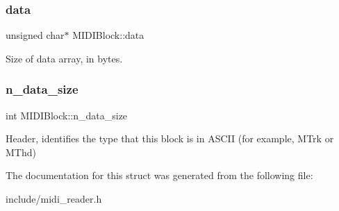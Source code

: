 \subsubsection{\texorpdfstring{data}{data}}
{\footnotesize\ttfamily unsigned char$\ast$ M\+I\+D\+I\+Block\+::data}

Size of data array, in bytes. \mbox{\label{structMIDIBlock_a20638ff9789b0deb8ece121078066931}} 
\subsubsection{\texorpdfstring{n\+\_\+data\+\_\+size}{n\_data\_size}}
{\footnotesize\ttfamily int M\+I\+D\+I\+Block\+::n\+\_\+data\+\_\+size}

Header, identifies the type that this block is in A\+S\+C\+II (for example, \textquotesingle{}M\+Trk\textquotesingle{} or \textquotesingle{}M\+Thd\textquotesingle{}) 

The documentation for this struct was generated from the following file\+:\begin{DoxyCompactItemize}
\item 
include/midi\+\_\+reader.\+h\end{DoxyCompactItemize}

